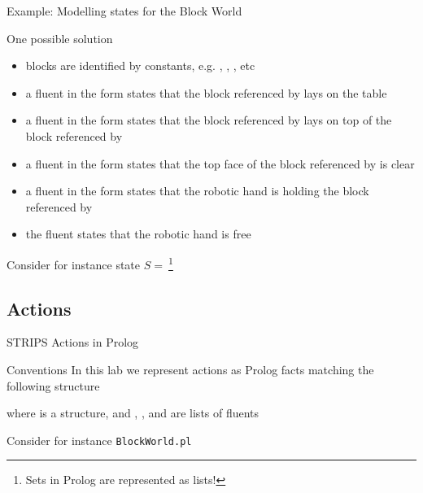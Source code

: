 \documentclass[presentation]{beamer}\mode<presentation>{\usetheme{AMSBolognaFC}}
\begin{document}
\begin{frame}[allowframebreaks]{Example: Modelling states for the Block World}

One possible solution
%
\begin{itemize}
    \item blocks are identified by constants, e.g. , , , etc
    \vfill
    \item a fluent in the form  states that the block referenced by  lays on the table
    \vfill
    \item a fluent in the form  states that the block referenced by  lays on top of the block referenced by 
    \vfill
    \item a fluent in the form  states that the top face of the block referenced by  is clear
    \vfill
    \item a fluent in the form  states that the robotic hand is holding the block referenced by 
    \vfill
    \item the fluent  states that the robotic hand is free
\end{itemize}

\framebreak

Consider for instance state $S =\ $\footnote{Sets in Prolog are represented as lists!}
%
\begin{center}

\end{center}

\end{frame}

\subsection{Actions}

\begin{frame}[c]{STRIPS Actions in Prolog}

\begin{block}{Conventions}
    In this lab we represent actions as Prolog facts matching the following structure
    \begin{center}
    \end{center}
    where  is a structure, and , , and  are lists of fluents

\end{block}

\begin{exampleblock}{Consider for instance \texttt{BlockWorld.pl}}
    
\end{exampleblock}

\end{frame}
\end{document}
